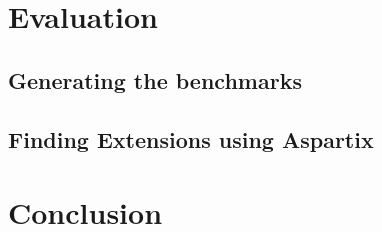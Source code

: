 \documentclass{scrartcl}
\begin{document}
\section{Evaluation}
\label{evaluation}
\subsection{Generating the benchmarks}
\subsection{Finding Extensions using Aspartix}

\section{Conclusion}
\label{conclusion}

\printbibliography
\end{document}
